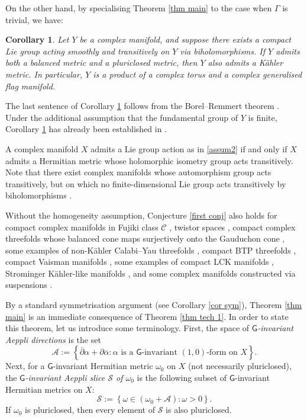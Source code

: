 \documentclass[11pt,reqno]{amsart}
\newcommand{\G}{\mathsf {G}}
\newcommand{\A}{\mathcal A}
\renewcommand{\S}{\mathcal S}
\theoremstyle{plain}
\newtheorem{introcorollary}[introtheorem]{Corollary}
\theoremstyle{definition}
\theoremstyle{remark}
\begin{document}
On the other hand, by specialising Theorem \ref{thm main} to the case when $\Gamma$ is trivial, we have:

\begin{introcorollary}
    \label{main cor 2}
    Let $Y$ be a complex manifold, and suppose there exists a compact Lie group acting smoothly and transitively on $Y$ via biholomorphisms.  If $Y$ admits both a balanced metric and a pluriclosed metric, then $Y$ also admits a K\"ahler metric. In particular, $Y$ is a product of a complex torus and a complex generalised flag manifold.
\end{introcorollary}
The last sentence of Corollary \ref{main cor 2} follows from the Borel--Remmert theorem \cite[Chapter 3.9]{Akhiezer}.
 Under the additional assumption that the fundamental group of $Y$ is finite,  Corollary \ref{main cor 2} has already been established in \cite{fino_2019, podesta}.

A complex manifold $X$ admits a Lie group action as in \eqref{assum2} if and only if $X$ admits a Hermitian metric whose holomorphic isometry group acts transitively. Note that there exist  complex manifolds whose automorphism group acts transitively, but on which no finite-dimensional Lie group acts transitively by biholomorphisms \cite{kaup}.

Without the homogeneity assumption,   Conjecture  \ref{first conj} also holds   for compact complex manifolds in Fujiki class $\mathcal C$ \cite{Chiose_2014}, twistor spaces \cite{verbitsky},  compact complex threefolds whose balanced cone maps surjectively onto the Gauduchon cone \cite{chiose2}, some examples of non-K\"ahler Calabi--Yau threefolds \cite{yau,teng,picard},  compact BTP threefolds \cite{chen}, compact Vaisman manifolds \cite{otiman2},  some examples of compact LCK manifolds \cite{ornea}, Strominger K\"ahler-like manifolds \cite{zheng2}, and  some complex manifolds constructed via suspensions \cite{suspense}.






By a standard symmetrisation argument (see Corollary \ref{cor sym}), Theorem \ref{thm main} is an immediate consequence of Theorem \ref{thm tech 1}. In order to state this theorem, let us introduce some terminology. First, the space of \textit{$\G$-invariant Aeppli directions} is the set
$$\A := \left\{ \overline \partial \alpha + \partial \overline \alpha : \text{$\alpha$ is a $\G$-invariant  $(1,0)$-form on $X$}\right\}.$$
Next, for  a $\G$-invariant Hermitian metric $\omega_0$ on $X$ (not necessarily pluriclosed), the \textit{$\G$-invariant Aeppli slice $\S$ of $\omega_0$} is the following subset of $\G$-invariant Hermitian metrics on $X$:
$$\S := \left\{ \omega \in (\omega_0 + \A) : \omega > 0\right\}.$$
If $\omega_0$ is pluriclosed, then every element of $\S$ is also pluriclosed.
\end{document}
